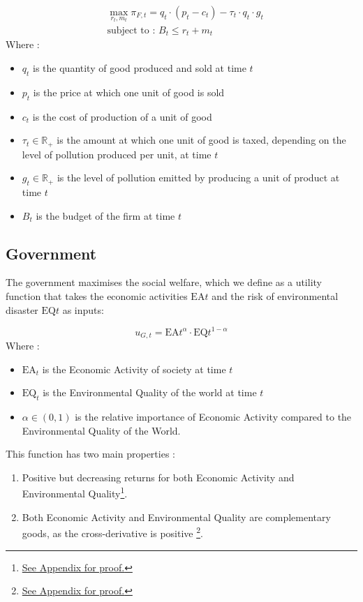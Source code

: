 \documentclass{article}
\begin{document}
\begin{equation}
    \begin{split}
        &\max_{r_{t},m_{t}}{\pi_{F,t}=q_{t}\cdot\left(p_{t}-c_{t}\right)-\tau_{t}\cdot q_{t}\cdot g_{t}} \\
        &\text{subject to : } B_{t} \leq r_{t} + m_{t}
    \end{split}
\end{equation}
Where : 
\begin{itemize}
    \item $q_{t}$ is the quantity of good produced and sold at time $t$
    \item $p_{t}$ is the price at which one unit of good is sold
    \item $c_{t}$ is the cost of production of a unit of good
    \item $\tau_{t}\in\mathbb{R}_{+}$ is the amount at which one unit of good is taxed, depending on the level of pollution produced per unit, at time $t$
    \item $g_{t}\in\mathbb{R}_{+}$ is the level of pollution emitted by producing a unit of product at time $t$
    \item $B_{t}$ is the budget of the firm at time $t$
\end{itemize}

\subsection{Government}
The government maximises the social welfare, which we define as a utility function that takes the  economic activities $\text{EA}{t}$ and the risk of environmental disaster $\text{EQ}{t}$ as inputs: 

\begin{equation}
    u_{G,t}=\text{EA}{t}^{\alpha}\cdot\text{EQ}{t}^{1-\alpha}
\end{equation}
Where : 
\begin{itemize}
    \item $\text{EA}_{t}$ is the Economic Activity of society at time $t$
    \item $\text{EQ}_{t}$ is the Environmental Quality of the world at time $t$
    \item $\alpha \in \left(0,1\right)$ is the relative importance of Economic Activity compared to the Environmental Quality of the World.
\end{itemize}
This function has two main properties : 

\begin{enumerate}
    \item Positive but decreasing returns for both Economic Activity and Environmental Quality\footnote{\hyperref[sec:properties_utility_function_gov_1]{See Appendix for proof.}}.
    \item Both Economic Activity and Environmental Quality are complementary goods, as the cross-derivative is positive \footnote{\hyperref[sec:properties_utility_function_gov_2]{See Appendix for proof.}}.
\end{enumerate}
\end{document}
